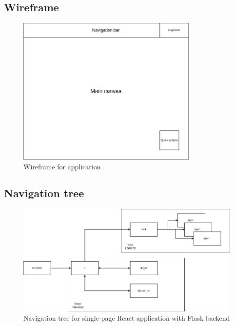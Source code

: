 \subsection{Wireframe}\label{subsec:wireframe3}
\begin{figure}[H]
    \centering
    \includegraphics[width=0.8\textwidth]{../images/wireframe}
    \caption{Wireframe for application}
    \label{fig:wireframe}
\end{figure}

\clearpage

\subsection{Navigation tree}\label{subsec:navigation-tree3}
\begin{figure}[h]
    \centering
    \includegraphics[width=\textwidth]{../images/navigation tree}
    \caption{Navigation tree for single-page React application with Flask backend}
    \label{fig:navigationTree}
\end{figure}


